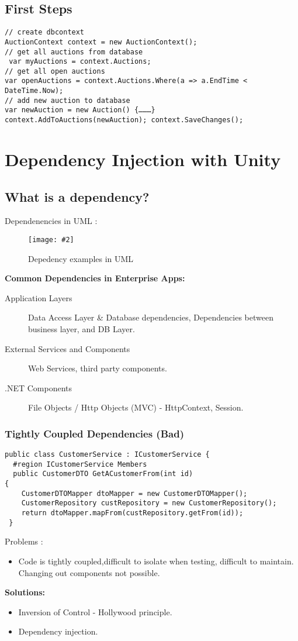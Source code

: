 \documentclass[a4paper,10pt]{scrreprt}
\newcommand{\pic}[2][figure]{\begin{figure}[h]
 \centering
 \texttt{[image: \#2]}
 \caption{#1}
\end{figure}
}
\begin{document}
\section{First Steps}
\begin{lstlisting}[caption=Initial Entity Framework Example]
// create dbcontext 
AuctionContext context = new AuctionContext();
// get all auctions from database
 var myAuctions = context.Auctions;
// get all open auctions 
var openAuctions = context.Auctions.Where(a => a.EndTime < DateTime.Now);
// add new auction to database 
var newAuction = new Auction() {………} context.AddToAuctions(newAuction); context.SaveChanges();
\end{lstlisting}
\chapter{Dependency Injection with Unity}
\section{What is a dependency?}
Dependenencies in UML : \\
\pic[Depedency examples in UML]{dep.png}
\textbf{Common Dependencies in Enterprise Apps:}
\begin{description}
 \item [Application Layers] Data Access Layer \& Database dependencies, Dependencies between business layer, and DB 
Layer.
 \item [External Services and Components] Web Services, third party components.
 \item [.NET Components] File Objects / Http Objects (MVC) - HttpContext, Session.
\end{description}

\subsection{Tightly Coupled Dependencies (Bad)}
\begin{lstlisting}[caption=Bad DI Example]
 public class CustomerService : ICustomerService {
  #region ICustomerService Members
  public CustomerDTO GetACustomerFrom(int id)
{
    CustomerDTOMapper dtoMapper = new CustomerDTOMapper();
    CustomerRepository custRepository = new CustomerRepository();
    return dtoMapper.mapFrom(custRepository.getFrom(id));
 }
\end{lstlisting}

Problems :
\begin{itemize}
 \item Code is tightly coupled,difficult to isolate when testing, difficult to maintain. Changing out components not 
possible.
\end{itemize}
\textbf{Solutions:}
\begin{itemize}
 \item Inversion of Control - Hollywood principle.
 \item Dependency injection.
\end{itemize}
\end{document}
